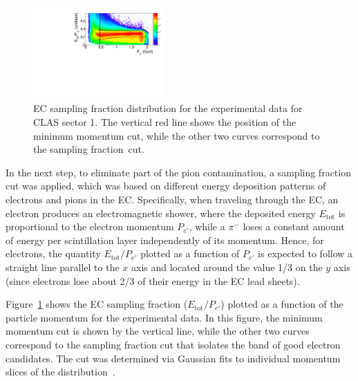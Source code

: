 \documentclass[prc,twocolumn,superscriptaddress,showpacs,amssymb,amsmath,amsfonts,aps,nofootinbib]{revtex4-1}
\begin{document}
\begin{figure}[htp]
\begin{center}
 \includegraphics[width=0.45\textwidth,keepaspectratio]{pictures/event_selection/ectot.pdf}
\caption{EC sampling fraction distribution for the experimental data for CLAS sector 1. The vertical red line shows the position of the minimum momentum cut, while the other two curves correspond to the sampling fraction~cut.}
\label{fig:ec_cut}
\end{center}
\end{figure}

In the next step, to eliminate part of the pion contamination, a sampling fraction cut was applied, which was based on different energy deposition patterns of electrons and pions in the EC. Specifically, when traveling through the EC, an electron produces an electromagnetic shower, where the deposited energy $E_{\text{tot}}$ is proportional to the electron momentum $P_{e'}$, while a $\pi^{-}$ loses a constant amount of energy per scintillation layer independently of its momentum. Hence, for electrons, the quantity $E_{\text{tot}}/P_{e'}$ plotted as a function of $P_{e'}$ is expected to follow a straight line parallel to the $x$ axis and located around the value 1/3 on the $y$ axis (since electrons lose about 2/3 of their energy in the EC lead sheets).


Figure~\ref{fig:ec_cut} shows the EC sampling fraction ($E_{\text{tot}}/P_{e'}$) plotted as a function of the particle momentum for the experimental data. In this figure, the minimum momentum cut is shown by the vertical line, while the other two curves correspond to the sampling fraction cut that isolates the band of good electron candidates. The cut was determined via Gaussian fits to individual momentum slices of the distribution~\cite{my_an_note:2020, my_thesis:2021}.
\end{document}
